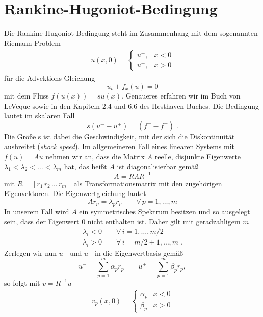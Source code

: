 \section{Rankine-Hugoniot-Bedingung}
\label{sec:rhc}
Die Rankine-Hugoniot-Bedingung steht im Zusammenhang mit dem sogenannten Riemann-Problem
\begin{align}
  u(x,0) = \begin{cases} u^- , & x < 0 \\
                         u^+ , & x > 0
           \end{cases}
\end{align}
für die Advektions-Gleichung
\begin{equation}
  u_t + f_x(u) = 0
\end{equation}
mit dem Fluss $f(u(x)) = s u(x)$.
Genaueres erfahren wir im Buch von LeVeque sowie in den Kapiteln 2.4 und 6.6 des Hesthaven Buches. Die Bedingung lautet im skalaren Fall
\begin{equation}
  s(u^- - u^+) = (f^- - f^+) \; .
  \label{eq:rhc}
\end{equation}
Die Größe s ist dabei die Geschwindigkeit, mit der sich die Diskontinuität ausbreitet (\emph{shock speed}). Im allgemeineren Fall eines linearen Systems mit $f(u) = A u$ nehmen wir an, dass die Matrix $A$ reelle, disjunkte Eigenwerte $\lambda_1 < \lambda_2 < \dots < \lambda_m$ hat, das heißt $A$ ist diagonalisierbar gemäß
\begin{equation}
  A = R \Lambda R^{-1}
\end{equation}
mit $R=[r_1 \, r_2 \, \dots \, r_m]$ als Transformationsmatrix mit den zugehörigen Eigenvektoren. Die Eigenwertgleichung lautet
\begin{equation}
  Ar_p = \lambda_p r_p \qquad \forall \, p=1,\dots, m
  \label{eq:EWeq_A}
\end{equation}
In unserem Fall wird $A$ ein symmetrisches Spektrum besitzen und so ausgelegt sein, dass der Eigenwert 0 nicht enthalten ist.  Daher gilt mit geradzahligem $m$
\begin{align}
  \lambda_i < 0 \qquad \forall \, i=1,\dots,m/2 \\
  \lambda_i > 0 \qquad \forall \, i=m/2+1,\dots,m \; .
\end{align}
Zerlegen wir nun $u^-$ und $u^+$ in die Eigenwertbasis gemäß
\begin{equation}
  u^- = \sum_{p=1}^m \alpha_p r_p \qquad u^+ = \sum_{p=1}^m \beta_p r_p,
\end{equation}
so folgt mit $v = R^{-1}u$
\begin{align}
  v_p(x,0) = \begin{cases} \alpha_p & x < 0 \\
                          \beta_p & x > 0 \end{cases}
\end{align}
